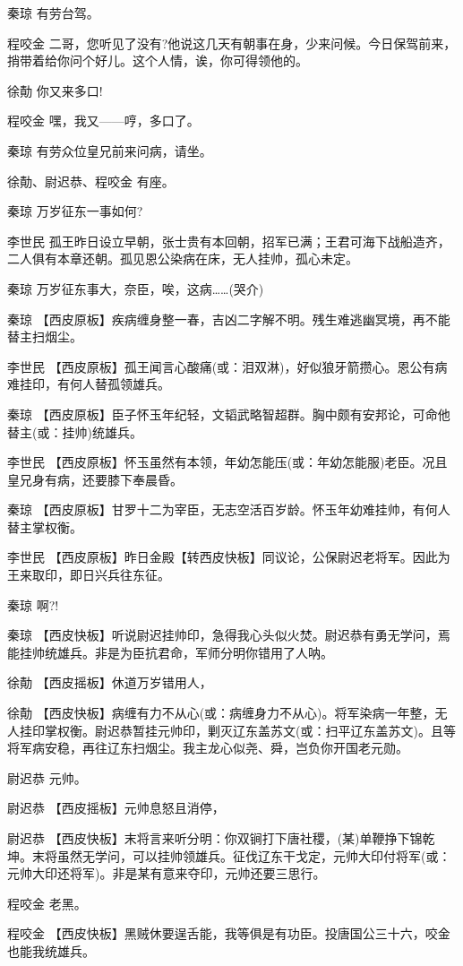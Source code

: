 秦琼 有劳台驾。

程咬金
二哥，您听见了没有?他说这几天有朝事在身，少来问候。今日保驾前来，捎带着给你问个好儿。这个人情，诶，你可得领他的。

徐勣 你又来多口!

程咬金 嘿，我又------哼，多口了。

秦琼 有劳众位皇兄前来问病，请坐。

徐勣、尉迟恭、程咬金 有座。

秦琼 万岁征东一事如何?

李世民
孤王昨日设立早朝，张士贵有本回朝，招军已满；王君可海下战船造齐，二人俱有本章还朝。孤见恩公染病在床，无人挂帅，孤心未定。

秦琼 万岁征东事大，奈臣，唉，这病\ldots{}\ldots{}(哭介)

秦琼
【西皮原板】疾病缠身整一春，吉凶二字解不明。残生难逃幽冥境，再不能替主扫烟尘。

李世民
【西皮原板】孤王闻言心酸痛(或：泪双淋)，好似狼牙箭攒心。恩公有病难挂印，有何人替孤领雄兵。

秦琼
【西皮原板】臣子怀玉年纪轻，文韬武略智超群。胸中颇有安邦论，可命他替主(或：挂帅)统雄兵。

李世民
【西皮原板】怀玉虽然有本领，年幼怎能压(或：年幼怎能服)老臣。况且皇兄身有病，还要膝下奉晨昏。

秦琼
【西皮原板】甘罗十二为宰臣，无志空活百岁龄。怀玉年幼难挂帅，有何人替主掌权衡。

李世民
【西皮原板】昨日金殿【转西皮快板】同议论，公保尉迟老将军。因此为王来取印，即日兴兵往东征。

秦琼 啊?!

秦琼
【西皮快板】听说尉迟挂帅印，急得我心头似火焚。尉迟恭有勇无学问，焉能挂帅统雄兵。非是为臣抗君命，军师分明你错用了人呐。

徐勣 【西皮摇板】休道万岁错用人，

徐勣
【西皮快板】病缠有力不从心(或：病缠身力不从心)。将军染病一年整，无人挂印掌权衡。尉迟恭暂挂元帅印，剿灭辽东盖苏文(或：扫平辽东盖苏文)。且等将军病安稳，再往辽东扫烟尘。我主龙心似尧、舜，岂负你开国老元勋。

尉迟恭 元帅。

尉迟恭 【西皮摇板】元帅息怒且消停，

尉迟恭
【西皮快板】末将言来听分明：你双锏打下唐社稷，(某)单鞭挣下锦乾坤。末将虽然无学问，可以挂帅领雄兵。征伐辽东干戈定，元帅大印付将军(或：元帅大印还将军)。非是某有意来夺印，元帅还要三思行。

程咬金 老黑。

程咬金
【西皮快板】黑贼休要逞舌能，我等俱是有功臣。投唐国公三十六，咬金也能我统雄兵。

